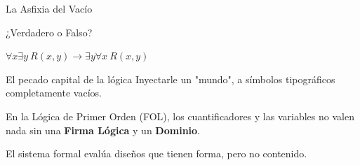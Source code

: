 \documentclass[10pt, aspectratio=169]{beamer}
\begin{document}
\begin{frame}{La Asfixia del Vacío}
    \begin{center}
        \Large ¿Verdadero o Falso?
        
        \vspace{1.2cm}
        \huge
        $\forall x \exists y \ R(x, y) \to \exists y \forall x \ R(x, y)$
    \end{center}
\end{frame}

\begin{frame}{El pecado capital de la lógica}
    \vspace{0.5cm}
    \Large
    Inyectarle un "mundo", a símbolos tipográficos completamente vacíos.
    
    \vspace{0.8cm}
    \normalsize
    En la Lógica de Primer Orden (FOL), los cuantificadores y las variables no valen nada sin una \textbf{Firma Lógica} y un \textbf{Dominio}. 
    
    \vspace{0.4cm}
    \alert{El sistema formal evalúa diseños que tienen forma, pero no contenido.}
\end{frame}
\end{document}
